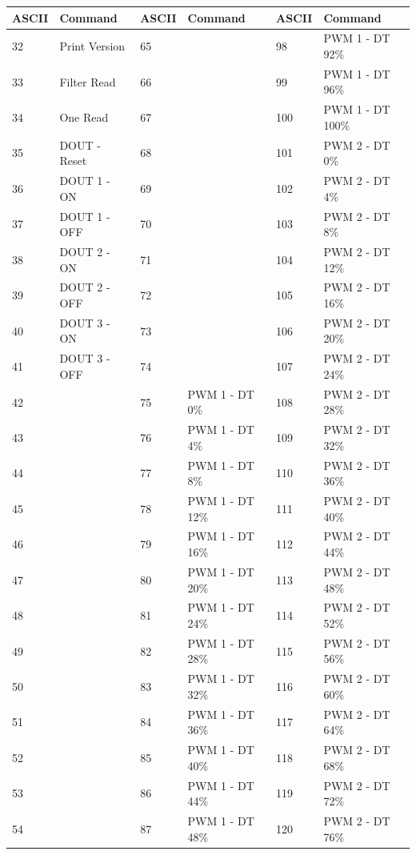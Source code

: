 	\begin{table}[h!]\label{table:ascii-commands}
		\begin{tabular}{|l|l|l|l|l|l|}
		\hline
		\textbf{ASCII} & \textbf{Command} & \textbf{ASCII} & \textbf{Command} & \textbf{ASCII} & \textbf{Command} \\ \hline
		32 & Print Version & 65 &  & 98 & PWM 1 - DT 92\% \\ \hline
		33 & Filter Read & 66 &  & 99 & PWM 1 - DT 96\% \\ \hline
		34 & One Read & 67 &  & 100 & PWM 1 - DT 100\% \\ \hline
		35 & DOUT - Reset & 68 &  & 101 & PWM 2 - DT 0\% \\ \hline
		36 & DOUT 1 - ON & 69 &  & 102 & PWM 2 - DT 4\% \\ \hline
		37 & DOUT 1 - OFF & 70 &  & 103 & PWM 2 - DT 8\% \\ \hline
		38 & DOUT 2 - ON & 71 &  & 104 & PWM 2 - DT 12\% \\ \hline
		39 & DOUT 2 - OFF & 72 &  & 105 & PWM 2 - DT 16\% \\ \hline
		40 & DOUT 3 - ON & 73 &  & 106 & PWM 2 - DT 20\% \\ \hline
		41 & DOUT 3 - OFF & 74 &  & 107 & PWM 2 - DT 24\% \\ \hline
		42 &  & 75 & PWM 1 - DT 0\% & 108 & PWM 2 - DT 28\% \\ \hline
		43 &  & 76 & PWM 1 - DT 4\% & 109 & PWM 2 - DT 32\% \\ \hline
		44 &  & 77 & PWM 1 - DT 8\% & 110 & PWM 2 - DT 36\% \\ \hline
		45 &  & 78 & PWM 1 - DT 12\% & 111 & PWM 2 - DT 40\% \\ \hline
		46 &  & 79 & PWM 1 - DT 16\% & 112 & PWM 2 - DT 44\% \\ \hline
		47 &  & 80 & PWM 1 - DT 20\% & 113 & PWM 2 - DT 48\% \\ \hline
		48 &  & 81 & PWM 1 - DT 24\% & 114 & PWM 2 - DT 52\% \\ \hline
		49 &  & 82 & PWM 1 - DT 28\% & 115 & PWM 2 - DT 56\% \\ \hline
		50 &  & 83 & PWM 1 - DT 32\% & 116 & PWM 2 - DT 60\% \\ \hline
		51 &  & 84 & PWM 1 - DT 36\% & 117 & PWM 2 - DT 64\% \\ \hline
		52 &  & 85 & PWM 1 - DT 40\% & 118 & PWM 2 - DT 68\% \\ \hline
		53 &  & 86 & PWM 1 - DT 44\% & 119 & PWM 2 - DT 72\% \\ \hline
		54 &  & 87 & PWM 1 - DT 48\% & 120 & PWM 2 - DT 76\% \\ \hline

\end{tabular}
\end{table}
